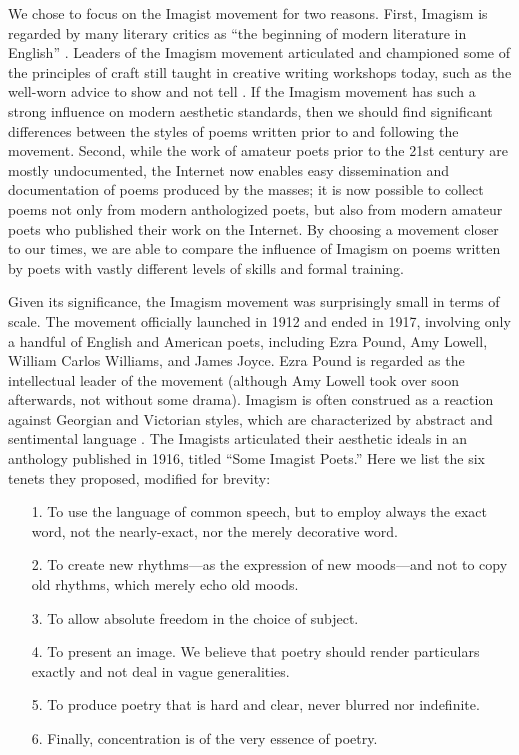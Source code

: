 \documentclass{book}
\begin{document}
We chose to focus on the Imagist movement for two reasons. First, Imagism is regarded by many literary critics as ``the beginning of modern literature in English'' \citep{pratt1992imagism}. Leaders of the Imagism movement articulated and championed some of the principles of craft still taught in creative writing workshops today, such as the well-worn advice to show and not tell \citep{PoetsCompanion, Burroway}. If the Imagism movement has such a strong influence on modern aesthetic standards, then we should find significant differences between the styles of poems written prior to and following the movement. Second, while the work of amateur poets prior to the 21st century are mostly undocumented, the Internet now enables easy dissemination and documentation of poems produced by the masses; it is now possible to collect poems not only from modern anthologized poets, but also from modern amateur poets who published their work on the Internet. By choosing a movement closer to our times, we are able to compare the influence of Imagism on poems written by poets with vastly different levels of skills and formal training. 

Given its significance, the Imagism movement was surprisingly small in terms of scale. The movement officially launched in 1912 and ended in 1917, involving only a handful of English and American poets, including Ezra Pound, Amy Lowell, William Carlos Williams, and James Joyce. Ezra Pound is regarded as the intellectual leader of the movement (although Amy Lowell took over soon afterwards, not without some drama). Imagism is often construed as a reaction against Georgian and Victorian styles, which are characterized by abstract and sentimental language \citep{frank1991idea}. The Imagists articulated their aesthetic ideals in an anthology published in 1916, titled ``Some Imagist Poets.'' Here we list the six tenets they proposed, modified for brevity:
\begin{itemize}
\item[1.] To use the language of common speech, but to employ always the exact word, not the nearly-exact, nor the merely decorative word.
\item[2.] To create new rhythms---as the expression of new moods---and not to copy old rhythms, which merely echo old moods. 
\item[3.] To allow absolute freedom in the choice of subject.
\item[4.] To present an image. We believe that poetry should render particulars exactly and not deal in vague generalities.
\item[5.] To produce poetry that is hard and clear, never blurred nor indefinite.
\item[6.] Finally, concentration is of the very essence of poetry.
\end{itemize}
\end{document}
